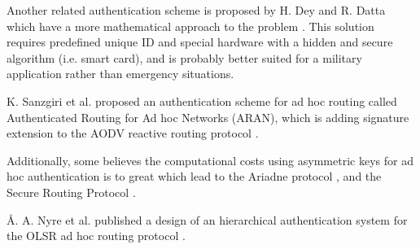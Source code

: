 Another related authentication scheme is proposed by H. Dey and R. Datta which
have a more mathematical approach to the problem \cite{springerlink:Haimabati}.
This solution requires predefined unique ID and special hardware with a hidden
and secure algorithm (i.e. smart card), and is probably better suited for a
military application rather than emergency situations.

K. Sanzgiri et al. proposed an authentication scheme for ad hoc routing called
Authenticated Routing for Ad hoc Networks (ARAN), which is adding signature
extension to the AODV reactive routing protocol \cite{sanzgiri2005authenticated}.

Additionally, some believes the computational costs using asymmetric keys for ad
hoc authentication is to great which lead to the Ariadne protocol
\cite{hu2005ariadne}, and the Secure Routing Protocol
\cite{papadimitratos2002secure}.

{\AA}. A. Nyre et al. published a design of an hierarchical authentication
system for the OLSR ad hoc routing protocol \cite{nyre2009secure}.